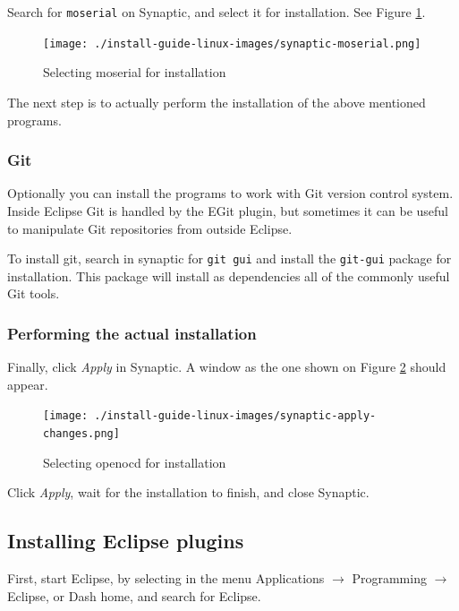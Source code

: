 \documentclass[a4paper, 10pt]{article}
\begin{document}
Search for \verb+moserial+ on Synaptic, and select it for installation.
See Figure \ref{fig:synaptic-moserial}.


    \begin{figure}[H]
    \centering
        \texttt{[image: ./install-guide-linux-images/synaptic-moserial.png]}
        \caption{Selecting moserial for installation}
        \label{fig:synaptic-moserial}
    \end{figure}


The next step is to actually perform the installation of the above mentioned programs.

\subsubsection{Git}

Optionally you can install the programs to work with Git version control system.
Inside Eclipse Git is handled by the EGit plugin, but sometimes it can be useful
to manipulate Git repositories from outside Eclipse.

To install git, search in synaptic for \verb+git gui+ and
install the \verb+git-gui+ package for installation.
This package will install as dependencies all of the commonly useful Git tools.

\subsubsection{Performing the actual installation}

Finally, click \emph{Apply} in Synaptic.
A window as the one shown on Figure \ref{fig:synaptic-apply-changes.png}
should appear.

    \begin{figure}[H]
    \centering
        \texttt{[image: ./install-guide-linux-images/synaptic-apply-changes.png]}
        \caption{Selecting openocd for installation}
        \label{fig:synaptic-apply-changes.png}
    \end{figure}

Click \emph{Apply}, wait for the installation to finish, and close Synaptic.

\subsection{Installing Eclipse plugins}

First, start Eclipse, by selecting in the menu Applications $\rightarrow$
Programming $\rightarrow$ Eclipse,
or Dash home, and search for Eclipse.
\end{document}
